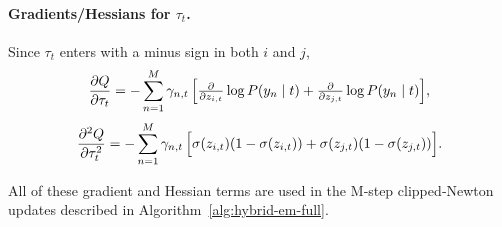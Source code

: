 \paragraph{Gradients/Hessians for \(\tau_t\).}  
Since \(\tau_t\) enters with a minus sign in both \(i\) and \(j\),
\[
  \frac{\partial Q}{\partial\tau_t}
  = -\sum_{n=1}^M \gamma_{n,t}\,\Bigl[
      \tfrac{\partial}{\partial z_{i,t}}\log P(y_n\mid t)
    + \tfrac{\partial}{\partial z_{j,t}}\log P(y_n\mid t)
    \Bigr],
\]
\[
  \frac{\partial^2Q}{\partial\tau_t^2}
  = -\sum_{n=1}^M \gamma_{n,t}\,\Bigl[
      \sigma(z_{i,t})(1-\sigma(z_{i,t}))
    + \sigma(z_{j,t})(1-\sigma(z_{j,t}))
    \Bigr].
\]

All of these gradient and Hessian terms are used in the M‐step clipped‐Newton updates described in Algorithm~\ref{alg:hybrid-em-full}.

